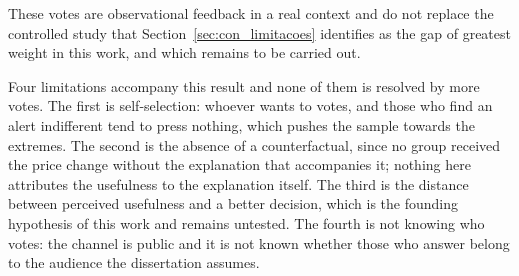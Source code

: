 These votes are observational feedback in a real context and do not replace the controlled study that Section~\ref{sec:con_limitacoes} identifies as the gap of greatest weight in this work, and which remains to be carried out.

Four limitations accompany this result and none of them is resolved by more votes. The first is self-selection: whoever wants to votes, and those who find an alert indifferent tend to press nothing, which pushes the sample towards the extremes. The second is the absence of a counterfactual, since no group received the price change without the explanation that accompanies it; nothing here attributes the usefulness to the explanation itself. The third is the distance between perceived usefulness and a better decision, which is the founding hypothesis of this work and remains untested. The fourth is not knowing who votes: the channel is public and it is not known whether those who answer belong to the audience the dissertation assumes.
